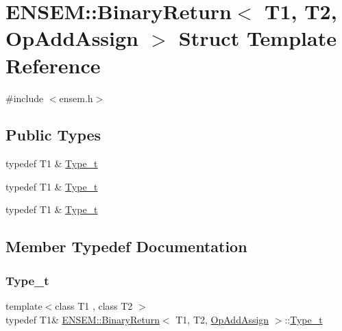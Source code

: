 \hypertarget{structENSEM_1_1BinaryReturn_3_01T1_00_01T2_00_01OpAddAssign_01_4}{}\section{E\+N\+S\+EM\+:\+:Binary\+Return$<$ T1, T2, Op\+Add\+Assign $>$ Struct Template Reference}
\label{structENSEM_1_1BinaryReturn_3_01T1_00_01T2_00_01OpAddAssign_01_4}


{\ttfamily \#include $<$ensem.\+h$>$}

\subsection*{Public Types}
\begin{DoxyCompactItemize}
\item 
typedef T1 \& \mbox{\hyperlink{structENSEM_1_1BinaryReturn_3_01T1_00_01T2_00_01OpAddAssign_01_4_a6d1b6a141221e93d9b7af97762049ec0}{Type\+\_\+t}}
\item 
typedef T1 \& \mbox{\hyperlink{structENSEM_1_1BinaryReturn_3_01T1_00_01T2_00_01OpAddAssign_01_4_a6d1b6a141221e93d9b7af97762049ec0}{Type\+\_\+t}}
\item 
typedef T1 \& \mbox{\hyperlink{structENSEM_1_1BinaryReturn_3_01T1_00_01T2_00_01OpAddAssign_01_4_a6d1b6a141221e93d9b7af97762049ec0}{Type\+\_\+t}}
\end{DoxyCompactItemize}


\subsection{Member Typedef Documentation}
\mbox{\label{structENSEM_1_1BinaryReturn_3_01T1_00_01T2_00_01OpAddAssign_01_4_a6d1b6a141221e93d9b7af97762049ec0}} 
\subsubsection{\texorpdfstring{Type\_t}{Type\_t}\hspace{0.1cm}{\footnotesize\ttfamily [1/3]}}
{\footnotesize\ttfamily template$<$class T1 , class T2 $>$ \\
typedef T1\& \mbox{\hyperlink{structENSEM_1_1BinaryReturn}{E\+N\+S\+E\+M\+::\+Binary\+Return}}$<$ T1, T2, \mbox{\hyperlink{structENSEM_1_1OpAddAssign}{Op\+Add\+Assign}} $>$\+::\mbox{\hyperlink{structENSEM_1_1BinaryReturn_3_01T1_00_01T2_00_01OpAddAssign_01_4_a6d1b6a141221e93d9b7af97762049ec0}{Type\+\_\+t}}}

